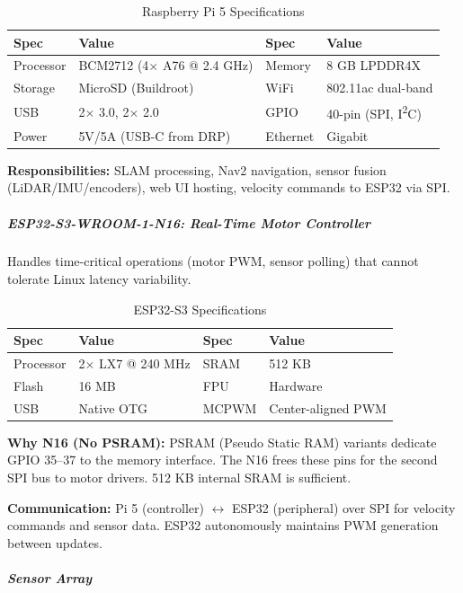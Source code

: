 \begin{table}[H]
\centering
\caption{Raspberry Pi 5 Specifications}
\begin{tabular}{@{}ll|ll@{}}
\toprule
\textbf{Spec} & \textbf{Value} & \textbf{Spec} & \textbf{Value} \\
\midrule
Processor & BCM2712 (4$\times$ A76 @ 2.4 GHz) & Memory & 8 GB LPDDR4X \\
Storage & MicroSD (Buildroot) & WiFi & 802.11ac dual-band \\
USB & 2$\times$ 3.0, 2$\times$ 2.0 & GPIO & 40-pin (SPI, I\textsuperscript{2}C) \\
Power & 5V/5A (USB-C from DRP) & Ethernet & Gigabit \\
\bottomrule
\end{tabular}
\end{table}

\textbf{Responsibilities:} SLAM processing, Nav2 navigation, sensor fusion (LiDAR/IMU/encoders), web UI hosting, velocity commands to ESP32 via SPI.

\subparagraph{ESP32-S3-WROOM-1-N16: Real-Time Motor Controller}
Handles time-critical operations (motor PWM, sensor polling) that cannot tolerate Linux latency variability.

\begin{table}[H]
\centering
\caption{ESP32-S3 Specifications}
\begin{tabular}{@{}ll|ll@{}}
\toprule
\textbf{Spec} & \textbf{Value} & \textbf{Spec} & \textbf{Value} \\
\midrule
Processor & 2$\times$ LX7 @ 240 MHz & SRAM & 512 KB \\
Flash & 16 MB & FPU & Hardware \\
USB & Native OTG & MCPWM & Center-aligned PWM \\
\bottomrule
\end{tabular}
\end{table}

\textbf{Why N16 (No PSRAM):} PSRAM (Pseudo Static RAM) variants dedicate GPIO 35--37 to the memory interface. The N16 frees these pins for the second SPI bus to motor drivers. 512 KB internal SRAM is sufficient.

\textbf{Communication:} Pi 5 (controller) $\leftrightarrow$ ESP32 (peripheral) over SPI for velocity commands and sensor data. ESP32 autonomously maintains PWM generation between updates.

\subparagraph{Sensor Array}

